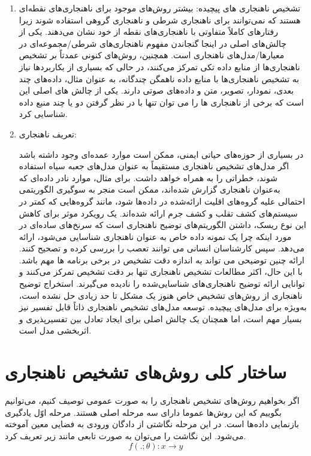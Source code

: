 \documentclass[12pt,a4paper]{report}
\begin{document}
\begin{enumerate}
{}

\item{
تشخیص ناهنجاری های پیچیده:
بیشتر روش‌های موجود برای ناهنجاری‌های نقطه‌ای هستند که نمی‌توانند برای ناهنجاری شرطی و ناهنجاری گروهی استفاده شوند زیرا رفتارهای کاملاً متفاوتی با ناهنجاری‌های نقطه از خود نشان می‌دهند. یکی از چالش‌های اصلی در اینجا گنجاندن مفهوم ناهنجاری‌های شرطی/مجموعه‌ای در معیارها/مدل‌های ناهنجاری است. همچنین، روش‌های کنونی عمدتاً بر تشخیص ناهنجاری‌ها از منابع داده تکی تمرکز می‌کنند، در حالی که بسیاری از بکاربردها
 نیاز به تشخیص ناهنجاری‌ها با منابع داده ناهمگن چندگانه، به عنوان مثال، داده‌های چند بعدی، نمودار، تصویر، متن و داده‌های صوتی دارند. یکی از چالش های اصلی این است که برخی از ناهنجاری ها را می توان تنها با در نظر گرفتن دو یا چند منبع داده شناسایی کرد.
}

\item {
تعریف ناهنجاری:

در بسیاری از حوزه‌های حیاتی ایمنی، ممکن است موارد عمده‌ای وجود داشته باشد اگر مدل‌های تشخیص ناهنجاری مستقیماً به عنوان مدل‌های جعبه سیاه استفاده شوند، خطراتی را به همراه خواهد داشت. برای مثال، موارد نادر داده‌ای که به‌عنوان ناهنجاری گزارش شده‌اند، ممکن است منجر به سوگیری الگوریتمی احتمالی علیه گروه‌های اقلیت ارائه‌شده در داده‌ها شود، مانند گروه‌هایی که کمتر در سیستم‌های کشف تقلب و کشف جرم ارائه شده‌اند. یک رویکرد موثر برای کاهش این نوع ریسک، داشتن الگوریتم‌های توضیح ناهنجاری است که سرنخ‌های ساده‌ای در مورد اینکه چرا یک نمونه داده خاص به عنوان ناهنجاری شناسایی می‌شود، ارائه می‌دهد. سپس کارشناسان انسانی می توانند تعصب را بررسی کرده و تصحیح کنند. ارائه چنین توضیحی می تواند به اندازه دقت تشخیص در برخی برنامه ها مهم باشد. با این حال، اکثر مطالعات تشخیص ناهنجاری تنها بر دقت تشخیص تمرکز می‌کنند و توانایی ارائه توضیح ناهنجاری‌های شناسایی‌شده را نادیده می‌گیرند. استخراج توضیح ناهنجاری از روش‌های تشخیص خاص هنوز یک مشکل تا حد زیادی حل نشده است، به‌ویژه برای مدل‌های پیچیده. توسعه مدل‌های تشخیص ناهنجاری ذاتاً قابل تفسیر نیز بسیار مهم است، اما همچنان یک چالش اصلی برای ایجاد تعادل بین تفسیرپذیری و اثربخشی مدل است.
}
\end{enumerate}
\section{ساختار کلی روش‌های تشخیص ناهنجاری}

	اگر بخواهیم روش‌های تشخیص ناهنجاری را به صورت عمومی توصیف کنیم، می‌توانیم بگوییم که این روش‌ها عموما دارای سه مرحله اصلی هستند. مرحله اوّل یادگیری بازنمایی داد‌ه‌ها است. در این مرحله نگاشتی از دادگان ورودی به فضایی معین آموخته می‌شود. این نگاشت را می‌توان به صورت تابعی مانند زیر تعریف کرد.
\begin{equation}
f(.;\theta): x \rightarrow y
\end{equation}
	
\end{document}
